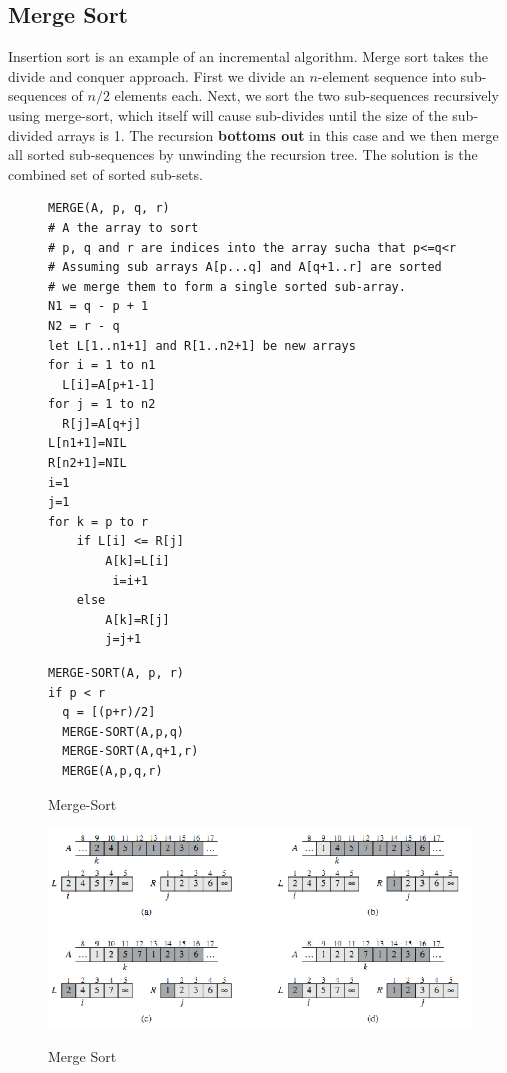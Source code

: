 \documentclass[10pt,a4paper]{article}
\begin{document}
\subsection{Merge Sort}
Insertion sort is an example of an incremental algorithm. Merge sort takes the divide and conquer approach. First we divide an $n$-element sequence into sub-sequences of $n/2$ elements each. Next, we sort the two sub-sequences recursively using merge-sort, which itself will cause sub-divides until the size of the sub-divided arrays is 1. The recursion {\bf bottoms out} in this case and we then merge all sorted sub-sequences by unwinding the recursion tree. The solution is the combined set of sorted sub-sets. 
\begin{figure}
\caption{Merge-Sort}
\begin{center}
\begin{lstlisting}
MERGE(A, p, q, r)
# A the array to sort
# p, q and r are indices into the array sucha that p<=q<r
# Assuming sub arrays A[p...q] and A[q+1..r] are sorted
# we merge them to form a single sorted sub-array. 
N1 = q - p + 1
N2 = r - q
let L[1..n1+1] and R[1..n2+1] be new arrays
for i = 1 to n1
  L[i]=A[p+1-1]
for j = 1 to n2
  R[j]=A[q+j]
L[n1+1]=NIL
R[n2+1]=NIL
i=1
j=1
for k = p to r
	if L[i] <= R[j]
  		A[k]=L[i]
 		 i=i+1
	else 
		A[k]=R[j]
  		j=j+1
\end{lstlisting}
\begin{lstlisting}
MERGE-SORT(A, p, r)
if p < r
  q = [(p+r)/2]
  MERGE-SORT(A,p,q)
  MERGE-SORT(A,q+1,r)
  MERGE(A,p,q,r)
\end{lstlisting}
\label{mslisting}
\end{center}
\end{figure}
\begin{figure}
\caption{Merge Sort\cite{INTROALG}}
\begin{center}
\includegraphics[scale=0.42]{../images/mergesort.png}
\label{mergesort}
\end{center}
\end{figure}
\end{document}
